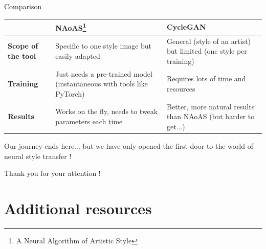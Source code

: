 \documentclass[12pt]{beamer}
\begin{document}
    \begin{frame}{Comparison}
        \begin{table}[H]
            \centering
            \footnotesize{
                \begin{tabular}{l|p{3cm}|p{3cm}}
                    & \textbf{NAoAS}\footnote{A Neural Algorithm of Artistic Style} & \textbf{CycleGAN}\\ \hline
                    \hline
                    \textbf{Scope of the tool} & Specific to one style image but easily adapted & General (style of an artist) but limited (one style per training)\\ \hline
                    \textbf{Training} & Just needs a pre-trained model \scriptsize{(instantaneous with tools like PyTorch)} & Requires lots of time and resources\\ \hline
                    \textbf{Results} & Works on the fly, needs to tweak parameters each time & Better, more natural results than NAoAS \scriptsize{(but harder to get...)}\\ \hline
                \end{tabular}
            }
        \end{table}
    \end{frame}
    
    
    \begin{frame}[standout]
        \footnotesize{Our journey ends here... but we have only opened the first door to the world of neural style transfer !}

        \Large{Thank you for your attention !}
    \end{frame}
    

    \begin{frame}[allowframebreaks]
        \nocite{*}
        \printbibliography
    \end{frame}
    
    
    \section{Additional resources}
    
\end{document}
